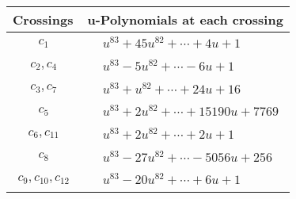 \documentclass[1p]{elsarticle_modified}
\theoremstyle{definition}
\begin{document}
\begin{tabular}{m{50pt}|m{274pt}}
Crossings & \hspace{64pt}u-Polynomials at each crossing \\
\hline $$\begin{aligned}c_{1}\end{aligned}$$&$\begin{aligned}
&u^{83}+45 u^{82}+\cdots+4 u+1
\end{aligned}$\\
\hline $$\begin{aligned}c_{2},c_{4}\end{aligned}$$&$\begin{aligned}
&u^{83}-5 u^{82}+\cdots-6 u+1
\end{aligned}$\\
\hline $$\begin{aligned}c_{3},c_{7}\end{aligned}$$&$\begin{aligned}
&u^{83}+u^{82}+\cdots+24 u+16
\end{aligned}$\\
\hline $$\begin{aligned}c_{5}\end{aligned}$$&$\begin{aligned}
&u^{83}+2 u^{82}+\cdots+15190 u+7769
\end{aligned}$\\
\hline $$\begin{aligned}c_{6},c_{11}\end{aligned}$$&$\begin{aligned}
&u^{83}+2 u^{82}+\cdots+2 u+1
\end{aligned}$\\
\hline $$\begin{aligned}c_{8}\end{aligned}$$&$\begin{aligned}
&u^{83}-27 u^{82}+\cdots-5056 u+256
\end{aligned}$\\
\hline $$\begin{aligned}c_{9},c_{10},c_{12}\end{aligned}$$&$\begin{aligned}
&u^{83}-20 u^{82}+\cdots+6 u+1
\end{aligned}$\\
\hline
\end{tabular}\\~\\
\newpage\renewcommand{\arraystretch}{1}
\end{document}
